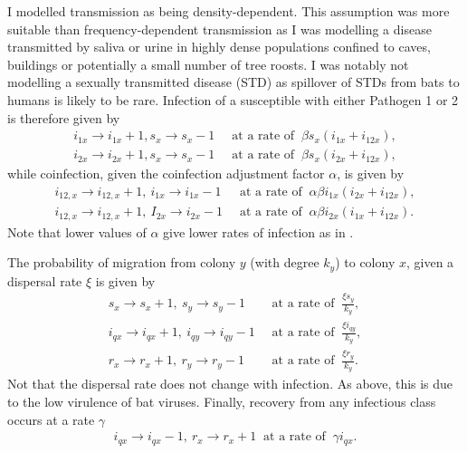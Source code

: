 I modelled transmission as being density-dependent.
This assumption was more suitable than frequency-dependent transmission as I was modelling a disease transmitted by saliva or urine in highly dense populations confined to caves, buildings or potentially a small number of tree roosts.
I was notably not modelling a sexually transmitted disease (STD) as spillover of STDs from bats to humans is likely to be rare.
Infection of a susceptible with either Pathogen 1 or 2 is therefore given by
\begin{align}
  i_{1x} \rightarrow i_{1x}+1, s_x \rightarrow s_x-1 &\;\;\text{at a rate of}\;\; \beta s_x\left(i_{1x} + i_{12x}\right),\\
  i_{2x} \rightarrow i_{2x}+1, s_x \rightarrow s_x-1  &\;\;\text{at a rate of}\;\; \beta s_x\left(i_{2x} + i_{12x}\right),
\end{align}
while coinfection, given the coinfection adjustment factor $\alpha$, is given by
\begin{align}
  i_{12,x} \rightarrow i_{12,x}+1,\: i_{1x} \rightarrow i_{1x}-1 &\;\;\text{at a rate of}\;\; \alpha\beta i_{1x}\left(i_{2x} + i_{12x}\right),\\
  i_{12,x} \rightarrow i_{12,x}+1,\: I_{2x} \rightarrow i_{2x}-1 &\;\;\text{at a rate of}\;\; \alpha\beta i_{2x}\left(i_{1x} + i_{12x}\right).
\end{align}
Note that lower values of $\alpha$ give lower rates of infection as in \textcite{castillo1989epidemiological}.


The probability of migration from colony $y$ (with degree $k_y$) to colony $x$, given a dispersal rate $\xi$ is given by
\begin{align}
  s_x \rightarrow s_x+1,\: s_y \rightarrow s_y-1 &\;\;\text{at a rate of}\;\; \frac{\xi s_y}{k_y},\\
  i_{qx} \rightarrow i_{qx}+1,\: i_{qy} \rightarrow i_{qy}-1 &\;\;\text{at a rate of}\;\; \frac{\xi i_{qy}}{k_y},\\
  r_x \rightarrow r_x+1,\: r_y \rightarrow r_y-1 &\;\;\text{at a rate of}\;\; \frac{\xi r_y}{k_y}.
\end{align}
Not that the dispersal rate does not change with infection.
As above, this is due to the low virulence of bat viruses.
Finally, recovery from any infectious class occurs at a rate $\gamma$
\begin{align}
  i_{qx} \rightarrow i_{qx}-1,\: r_x \rightarrow r_x+1  \;\;\text{at a rate of}\;\; \gamma i_{qx}.
\end{align}


